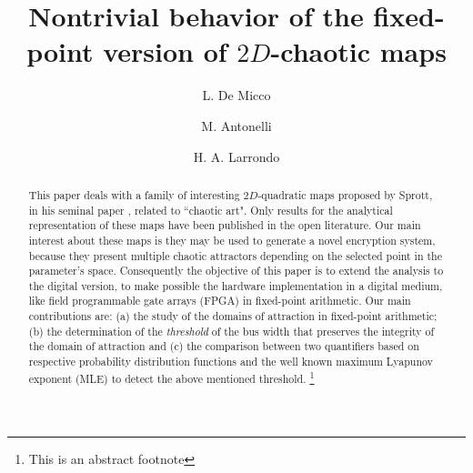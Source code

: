 \documentclass[manuscript, review, screen]{acmart}
\begin{document}
\title{Nontrivial behavior of the fixed-point version of $2D$-chaotic maps} 
\author{L. De Micco}

\author{M. Antonelli}
\author{H. A. Larrondo}
%  

\begin{abstract}
This paper deals with a family of interesting $2D$-quadratic maps
 proposed by Sprott, in his seminal paper \cite{Sprott1993},
related to ``chaotic art".  Only results for the analytical representation of these
maps have been published in the open literature. Our main interest about these maps is
they may be used to generate a novel encryption system, because
they present multiple chaotic attractors depending on the selected
point in the parameter's space. Consequently the objective of
this paper is to extend the analysis to the digital version, to make
possible  the hardware implementation in a digital medium, like field programmable gate arrays (FPGA) in fixed-point arithmetic.
Our main contributions are: (a) the study of the domains of attraction in fixed-point arithmetic; (b)  the determination of the \textsl{threshold} of the bus width that preserves the integrity of the domain of
attraction and (c) the comparison between two quantifiers based on respective probability distribution functions and  the well known maximum Lyapunov exponent (MLE) to detect the above mentioned threshold. \footnote{This is an abstract footnote}
\end{abstract}


%
%


\end{document}
